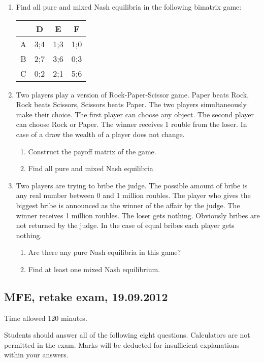 \documentclass[pdftex,12pt,a4paper]{article}
\begin{document}
\begin{enumerate}[resume]
\item Find all pure and mixed Nash equilibria in the following bimatrix game:


\begin{tabular}{c|ccc}
 & D & E & F \\ 
\hline 
A & 3;4 & 1;3 & 1;0  \\ 
B & 2;7 & 3;6 & 0;3  \\ 
C & 0;2 & 2;1 & 5;6  \\ 
\end{tabular} 
\item Two players play a version of Rock-Paper-Scissor game. Paper beats Rock, Rock beats Scissors, Scissors beats Paper. The two players simultaneously make their choice. The first player can choose any object. The second player can choose Rock or Paper. The winner receives 1 rouble from the loser. In case of a draw the wealth of a player does not change.
\begin{enumerate}
\item Construct the payoff matrix of the game.
\item Find all pure and mixed Nash equilibria
\end{enumerate}
\item Two players are trying to bribe the judge. The possible amount of bribe is any real number between 0 and 1 million roubles. The player who gives the biggest bribe is announced as the winner of the affair by the judge. The winner receives 1 million roubles. The loser gets nothing. Obviously bribes are not returned by the judge. In the case of equal bribes each player gets nothing.
\begin{enumerate}
\item Are there any pure Nash equilibria in this game?
\item Find at least one mixed Nash equilibrium.
\end{enumerate}

\end{enumerate}


\subsection{MFE, retake exam, 19.09.2012}

Time allowed 120 minutes.

Students should answer all of the following eight questions. Calculators are not permitted in the exam. Marks will be deducted for insufficient explanations within your answers.
\end{document}
